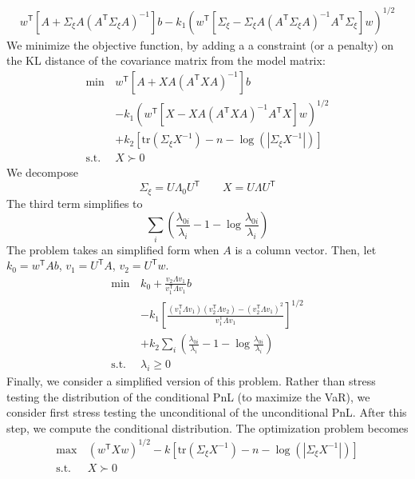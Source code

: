 \documentclass[letter, 12pt]{article}
\newcommand{\transpose}{^\mathsf{T}}
\newcommand{\trace}[1]{{\text{tr}}\left( #1 \right)}
\newcommand{\suchthat}{\text{s.t.}}
\newcommand{\inv}{^{-1}}
\begin{document}
\begin{align*} 
 w\transpose [A + \Sigma_\xi A (A\transpose \Sigma_\xi A)\inv] b - k_1( w\transpose [ \Sigma_\xi - \Sigma_\xi A ( A\transpose \Sigma_\xi A) \inv A\transpose \Sigma_\xi ] w)^{1/2}
\end{align*}
We minimize the objective function, by adding a a constraint (or a penalty) on the KL distance of the covariance matrix from the model matrix:
\begin{align*} 
\min \, & w\transpose [A + X A (A\transpose X  A)\inv] b \\
&- k_1( w\transpose [ X  - X  A ( A\transpose X  A) \inv A\transpose X  ] w)^{1/2} \\
&+ k_2 [\trace{\Sigma_\xi X\inv} -n -\log( |\Sigma_\xi X\inv|)]\\
\suchthat& X \succ 0
\end{align*}
We decompose
$$\Sigma_\xi=U\Lambda_0 U\transpose\qquad X=U\Lambda U\transpose $$
The third term simplifies to
\[
\sum_i \left(
	\frac{\lambda_{0i}}{\lambda_{i}} -1 -\log \frac{\lambda_{0i}}{\lambda_{i}} 
\right) 
\]
The problem takes an simplified form when $A$ is a column vector. Then, let $k_0= w\transpose A b$, $v_1=U\transpose A$, $v_2=U\transpose w$.
\begin{align*} 
\min \, & k_0+ \frac{v_2  \Lambda v_1}{v_1\transpose \Lambda v_1} b \\
&- k_1\left[\frac{(v_1\transpose \Lambda v_1 )(v_2\transpose \Lambda v_2)- (v_2\transpose \Lambda v_1)^2}{ v_1\transpose \Lambda v_1} \right]^{1/2} \\
&+ k_2 \sum_i \left(
	\frac{\lambda_{0i}}{\lambda_{i}} -1 -\log \frac{\lambda_{0i}}{\lambda_{i}} \right) \\
\suchthat& \lambda_i \ge 0
\end{align*}
Finally, we consider a simplified version of this problem. Rather than stress testing the distribution of the conditional PnL (to maximize the VaR), we consider first stress testing the unconditional of the unconditional PnL. After this step, we compute the conditional distribution. The optimization problem becomes
\begin{align*} 
\max \, & ( w\transpose  X   w)^{1/2}  - k [\trace{\Sigma_\xi X\inv} -n -\log( |\Sigma_\xi X\inv|)]\\
\suchthat& X \succ 0
\end{align*}
\end{document}
